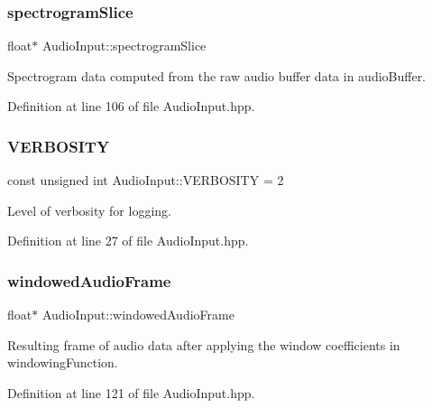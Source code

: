 \subsubsection{\texorpdfstring{spectrogram\+Slice}{spectrogramSlice}}
{\footnotesize\ttfamily float$\ast$ Audio\+Input\+::spectrogram\+Slice\hspace{0.3cm}{\ttfamily [protected]}}

Spectrogram data computed from the raw audio buffer data in audio\+Buffer. 

Definition at line 106 of file Audio\+Input.\+hpp.

\mbox{\label{classAudioInput_aff0f7df20d558ba13f85b3d49b7f42b2}} 
\subsubsection{\texorpdfstring{V\+E\+R\+B\+O\+S\+I\+TY}{VERBOSITY}}
{\footnotesize\ttfamily const unsigned int Audio\+Input\+::\+V\+E\+R\+B\+O\+S\+I\+TY = 2\hspace{0.3cm}{\ttfamily [static]}}

Level of verbosity for logging. 

Definition at line 27 of file Audio\+Input.\+hpp.

\mbox{\label{classAudioInput_ae5a196a9ba111b7aa1ef64db6f092432}} 
\subsubsection{\texorpdfstring{windowed\+Audio\+Frame}{windowedAudioFrame}}
{\footnotesize\ttfamily float$\ast$ Audio\+Input\+::windowed\+Audio\+Frame\hspace{0.3cm}{\ttfamily [protected]}}

Resulting frame of audio data after applying the window coefficients in windowing\+Function. 

Definition at line 121 of file Audio\+Input.\+hpp.

\mbox{\label{classAudioInput_a72417120c208d81359f5b1205fc06664}} 
